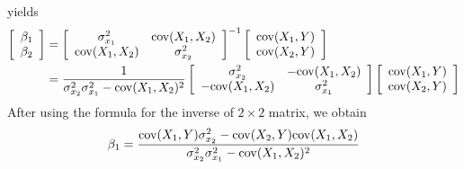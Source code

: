 \begin{itemize}
\begin{align*}
\end{align*}
yields 
\begin{align*}
\left[\begin{array}{c}
\beta_1 \\
\beta_2 
\end{array}\right] &= \left[\begin{array}{cc}
\sigma_{x_1}^2 & {\rm cov}(X_1,X_2)\\
 {\rm cov}(X_1,X_2) & \sigma_{x_2}^2
 \end{array} \right]^{-1}\left[ \begin{array}{c}
 {\rm cov}(X_1,Y)\\
  {\rm cov}(X_2,Y)\\
  \end{array}\right]\\
  &=  \frac{1}{\sigma_{x_2}^2\sigma_{x_1}^2 -{\rm cov}(X_1,X_2)^2} \left[\begin{array}{cc}
\sigma_{x_2}^2 & -{\rm cov}(X_1,X_2)\\
- {\rm cov}(X_1,X_2) & \sigma_{x_1}^2
 \end{array} \right]\left[ \begin{array}{c}
 {\rm cov}(X_1,Y)\\
  {\rm cov}(X_2,Y)\\
  \end{array}\right]
\end{align*}
After using the formula for the inverse of $2\times 2$ matrix, we obtain 
\begin{align}\label{eq:beta1cov}
\beta_1 =     \frac{ {\rm cov}(X_1,Y)\sigma_{x_2}^2 - {\rm cov}(X_2,Y){\rm cov}(X_1,X_2)}{\sigma_{x_2}^2\sigma_{x_1}^2 -{\rm cov}(X_1,X_2)^2}
\end{align}


\end{itemize}
